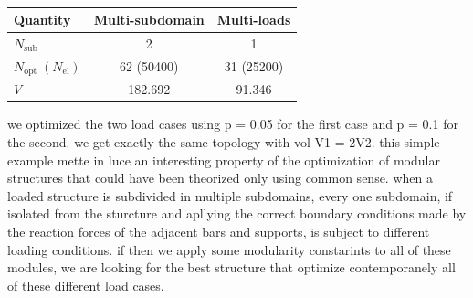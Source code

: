 \begin{figure}[]
    \hspace*{\fill}
    \hfill
    \hspace*{\fill}
    \caption{}
    \label{fig:05_cell_multi_eq_bcs}
\end{figure}


\begin{table}
    \centering
    \small
    \begin{tabular}{lcc}
        \toprule
        \textbf{Quantity} & Multi-subdomain & Multi-loads \\ \midrule
    $N_\text{sub}$       &2& 1   \\
    $N_\text{opt}\;(N_\text{el})$ & 62 (50400)&31 (25200)  \\
    $V$ &  182.692 & 91.346 \\ \bottomrule
    \end{tabular}
    \caption{}
    \label{tab:05_}
    \end{table}

we optimized the two load cases using p = 0.05 for the first case and p = 0.1 for the second. we get exactly the same topology with vol V1 = 2V2. this simple example mette in luce an interesting property of the optimization of modular structures that could have been theorized only using common sense. when a loaded structure is subdivided in multiple subdomains, every one subdomain, if isolated from the sturcture and apllying the correct boundary conditions made by the reaction forces of the adjacent bars and supports, is subject to different loading conditions. if then we apply some modularity constarints to all of these modules, we are looking for the best structure that optimize contemporanely all of these different load cases.

